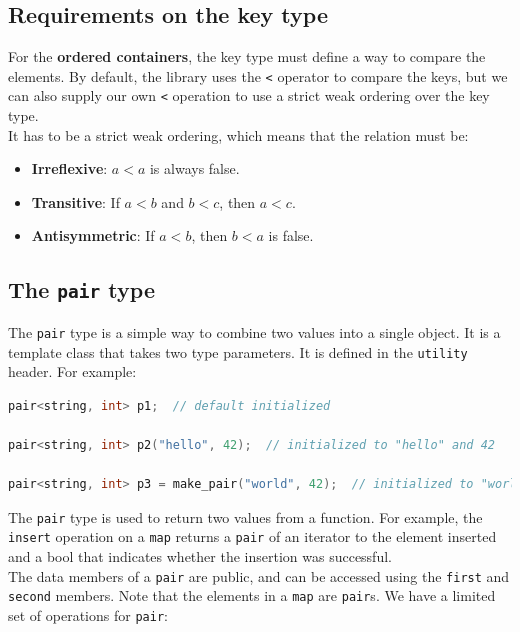 \subsection{Requirements on the key type}

For the \textbf{ordered containers}, the key type must define a way to compare the elements.
By default, the library uses the \texttt{<} operator to compare the keys, but we can also supply
our own \texttt{<} operation to use a strict weak ordering over the key type.\\

It has to be a strict weak ordering, which means that the relation must be:

\begin{itemize}
    \item \textbf{Irreflexive}: $a < a$ is always false.
    \item \textbf{Transitive}: If $a < b$ and $b < c$, then $a < c$.
    \item \textbf{Antisymmetric}: If $a < b$, then $b < a$ is false.
\end{itemize}

\subsection{The \texttt{pair} type}

The \texttt{pair} type is a simple way to combine two values into a single object. It is a
template class that takes two type parameters. It is defined in the \texttt{utility} header.
For example:\\

\begin{lstlisting}[language=C++]
pair<string, int> p1;  // default initialized

pair<string, int> p2("hello", 42);  // initialized to "hello" and 42

pair<string, int> p3 = make_pair("world", 42);  // initialized to "world" and 42
\end{lstlisting}

The \texttt{pair} type is used to return two values from a function. For example,
the \texttt{insert} operation on a \texttt{map} returns a \texttt{pair} of an iterator
to the element inserted and a bool that indicates whether the insertion was successful.\\

The data members of a \texttt{pair} are public, and can be accessed using the \texttt{first}
and \texttt{second} members. Note that the elements in a \texttt{map} are \texttt{pair}s.
We have a limited set of operations for \texttt{pair}:

